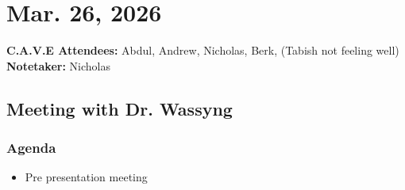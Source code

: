 	\pagebreak
	\section*{Mar. 26, 2026}

	\textbf{C.A.V.E Attendees:} Abdul, Andrew, Nicholas, Berk, (Tabish not feeling well)\\
	\textbf{Notetaker:} Nicholas

	\subsection*{Meeting with Dr. Wassyng}
		\subsubsection*{Agenda}
			\begin{itemize}
				\item Pre presentation meeting
			\end{itemize}


